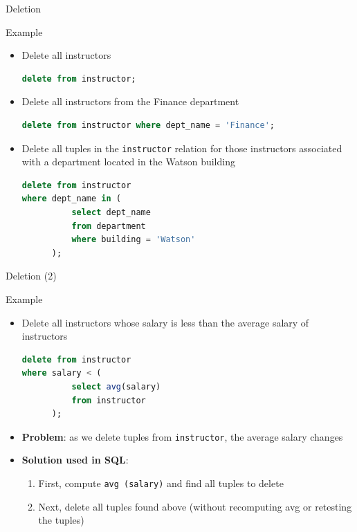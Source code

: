 \documentclass[aspectratio=169, xcolor=dvipsnames]{beamer}
\begin{document}
\begin{frame}[fragile]{Deletion}
    \begin{exampleblock}{Example}
        \begin{itemize}[<+->]
            \item Delete all instructors
            \begin{lstlisting}[language=SQL]
delete from instructor;
            \end{lstlisting}
            \item Delete all instructors from the Finance department
            \begin{lstlisting}[language=SQL]
delete from instructor where dept_name = 'Finance';
            \end{lstlisting}
            \item Delete all tuples in the \texttt{instructor} relation for those instructors associated with a department located in the Watson building
            \begin{lstlisting}[language=SQL]
delete from instructor 
where dept_name in (
          select dept_name 
          from department 
          where building = 'Watson'
      );
            \end{lstlisting}
        \end{itemize}
    \end{exampleblock}
\end{frame}

\begin{frame}[fragile]{Deletion (2)}
    \begin{exampleblock}{Example}
        \begin{itemize}[<+->]
            \item Delete all instructors whose salary is less than the average salary of instructors
            \begin{lstlisting}[language=SQL]
delete from instructor 
where salary < (
          select avg(salary) 
          from instructor
      );
            \end{lstlisting}
            \item \textbf{Problem}: as we delete tuples from \texttt{instructor}, the average salary changes
            \item \textbf{Solution used in SQL}:
            \begin{enumerate}
                \item First, compute \texttt{avg (salary)} and find all tuples to delete
                \item Next, delete all tuples found above (without recomputing avg or retesting the tuples)
            \end{enumerate}
        \end{itemize}
    \end{exampleblock}
\end{frame}
\end{document}
